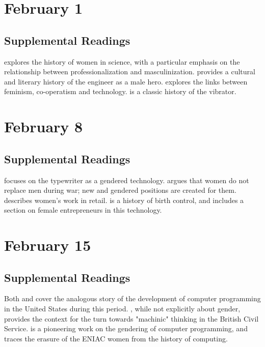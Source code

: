 \documentclass[11pt]{article}
\begin{document}
\section{February 1}


\subsection{Supplemental Readings}

\cite{Rossiter:1982vn} explores the history of women in science, with a particular emphasis on the relationship between professionalization and masculinization.   \cite{Tichi:1987wb} provides a cultural and literary history of the engineer as a male hero. \cite{Hacker:1989tm} explores the links between feminism, co-operatism and technology.  \cite{Maines:1999uw} is a classic history of the vibrator.

\section{February 8}


\subsection{Supplemental Readings}

\cite{Davies:1982vb} focuses on the typewriter as a gendered technology.
\cite{Milkman:1987tl} argues that women do not replace men during war;
new and gendered positions are created for them. \cite{Benson:1987wl}
describes women's work in retail. \cite{Tone:2001to} is a history of
birth control, and includes a section on female entrepreneurs in this
technology.

\section{February 15}


\subsection{Supplemental Readings}

Both \cite{Ensmenger:2010te} and \cite{Abbate:2012wq} cover the
analogous story of the development of computer programming in the United
States during this period. \cite{Agar:2003wf}, while not explicitly
about gender, provides the context for the turn towards "machinic"
thinking in the British Civil Service. \cite{Edwards:1990ua} is a pioneering work on the gendering of computer programming, and \cite{Light:1999wg} traces the erasure of the ENIAC women from the history of computing.
\end{document}
